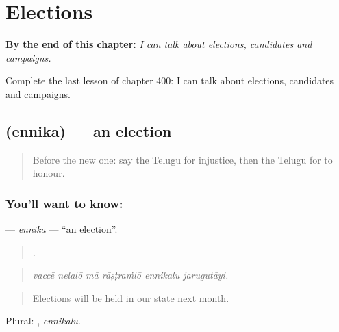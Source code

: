 
\chapter{Elections}
\label{ch:te-elections}

\begin{chapteropening}
\textbf{By the end of this chapter:} \emph{I can talk about elections, candidates and campaigns.}

Complete the last lesson of chapter 400: I can talk about elections, candidates and campaigns.
\end{chapteropening}

\section[\texorpdfstring{\te{ఎన్నిక} (ennika)}{ఎన్నిక (ennika)}]{ (ennika) — an election}

\label{lesson:TE-C400-ennika}



\begin{quote}
Before the new one: say the Telugu for injustice, then the Telugu for to honour.
\end{quote}

\subsection*{You'll want to know: }
\textbf{} — \emph{ennika} — \textquotedblleft{}an election\textquotedblright{}.

\begin{quote}
     .
\end{quote}

\begin{quote}
\emph{vaccē nelalō mā rāṣṭraṁlō ennikalu jarugutāyi.}
\end{quote}

\begin{quote}
Elections will be held in our state next month.
\end{quote}

Plural: , \emph{ennikalu}.

